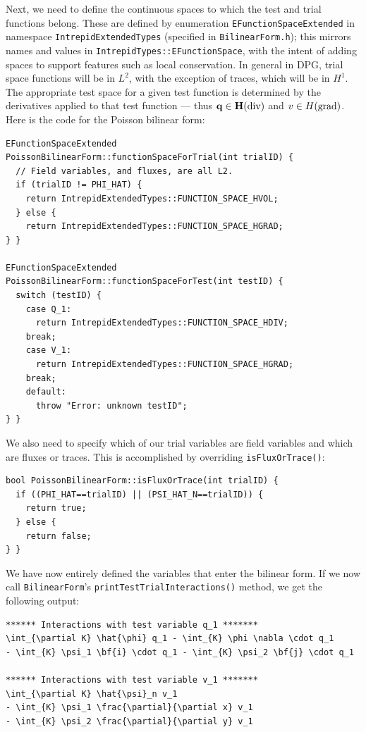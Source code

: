 Next, we need to define the continuous spaces to which the test and trial functions belong.  These are defined by enumeration \verb=EFunctionSpaceExtended= in namespace \verb=IntrepidExtendedTypes= (specified in \verb=BilinearForm.h=); this mirrors names and values in \verb=IntrepidTypes::EFunctionSpace=, with the intent of adding spaces to support features such as local conservation.  In general in DPG, trial space functions will be in $L^{2}$, with the exception of traces, which will be in $H^{1}$.  The appropriate test space for a given test function is determined by the derivatives applied to that test function --- thus $\bf{q} \in \NVRHdiv$ and $v \in \NVRHgrad$.  Here is the code for the Poisson bilinear form:
\begin{lstlisting}
EFunctionSpaceExtended
PoissonBilinearForm::functionSpaceForTrial(int trialID) {
  // Field variables, and fluxes, are all L2.
  if (trialID != PHI_HAT) {
    return IntrepidExtendedTypes::FUNCTION_SPACE_HVOL;
  } else {
    return IntrepidExtendedTypes::FUNCTION_SPACE_HGRAD;
} }

EFunctionSpaceExtended
PoissonBilinearForm::functionSpaceForTest(int testID) {
  switch (testID) {
    case Q_1:
      return IntrepidExtendedTypes::FUNCTION_SPACE_HDIV;
    break;
    case V_1:
      return IntrepidExtendedTypes::FUNCTION_SPACE_HGRAD;
    break;
    default:
      throw "Error: unknown testID";
} }
\end{lstlisting}

We also need to specify which of our trial variables are field variables and which are fluxes or traces.  This is accomplished by overriding \verb=isFluxOrTrace()=:
\begin{lstlisting}
bool PoissonBilinearForm::isFluxOrTrace(int trialID) {
  if ((PHI_HAT==trialID) || (PSI_HAT_N==trialID)) {
    return true;
  } else {
    return false;
} }
\end{lstlisting}

We have now entirely defined the variables that enter the bilinear form.  If we now call \verb=BilinearForm='s \verb=printTestTrialInteractions()= method, we get the following output:
\begin{lstlisting}
****** Interactions with test variable q_1 ******* 
\int_{\partial K} \hat{\phi} q_1 - \int_{K} \phi \nabla \cdot q_1
- \int_{K} \psi_1 \bf{i} \cdot q_1 - \int_{K} \psi_2 \bf{j} \cdot q_1

****** Interactions with test variable v_1 ******* 
\int_{\partial K} \hat{\psi}_n v_1 
- \int_{K} \psi_1 \frac{\partial}{\partial x} v_1
- \int_{K} \psi_2 \frac{\partial}{\partial y} v_1
\end{lstlisting}

